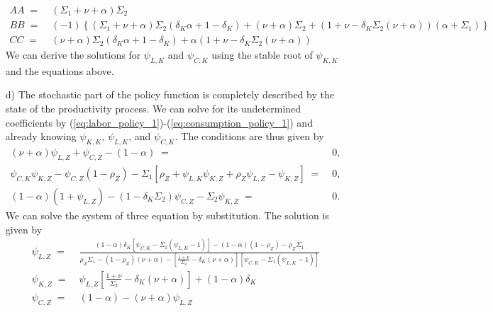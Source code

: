 \documentclass[a4paper, 12pt]{article}
\begin{document}
\begin{Answer}
\begin{small}
\begin{enumerate}
\begin{align*}
					AA \; = & \; \left(\Sigma_1+\nu+\alpha\right) \Sigma_2\\%
					BB \; = & \; \left(-1\right) \left\{ \left(\Sigma_1+\nu+\alpha\right)\Sigma_2\left(\delta_K\alpha+1-\delta_K\right)  + \left(\nu+\alpha\right)\Sigma_2 + \left(1+\nu-\delta_K \Sigma_2 \left(\nu+\alpha\right)\right) \left(\alpha+\Sigma_1\right)\right\}\\%
					CC \; = & \; \left(\nu+\alpha\right)\Sigma_2 \left(\delta_K \alpha+1-\delta_K\right) + \alpha \left(1+\nu-\delta_K \Sigma_2 \left(\nu+\alpha\right)\right)%
				  \end{align*}%
				  We can derive the solutions for $\psi_{L,K}$ and $\psi_{C,K}$ using the stable root of $\psi_{K,K}$ and the equations above.%
			\item[d) ] The stochastic part of the policy function is completely described by the state of the productivity process. We can solve for its undetermined coefficients by (\ref{eq:labor_policy_1})-(\ref{eq:consumption_policy_1}) and already knowing $\psi_{K,K}$, $\psi_{L,K}$, and $\psi_{C,K}$. The conditions are thus given by%
				  \begin{align}%
					\left(\nu+\alpha\right) \psi_{L,Z} + \psi_{C,Z} - \left(1-\alpha\right) \; = & \; 0,\\%
					\psi_{C,K}\psi_{K,Z} - \psi_{C,Z} \left(1-\rho_Z\right) - \Sigma_1 \left[ \rho_Z + \psi_{L,K} \psi_{K,Z} + \rho_Z \psi_{L,Z} - \psi_{K,Z} \right] \; = & \; 0,\\%
					\left(1-\alpha\right)\left(1+\psi_{L,Z}\right) - \left(1-\delta_K \Sigma_2\right) \psi_{C,Z} - \Sigma_2 \psi_{K,Z} \; = & \; 0.%
				  \end{align}%
				  We can solve the system of three equation by substitution. The solution is given by%
				  \begin{align}%
					\psi_{L,Z} \; = & \; \frac{\left(1-\alpha\right)\delta_K\left[\psi_{C,K}-\Sigma_1\left(\psi_{L,K}-1\right)\right]-\left(1-\alpha\right)\left(1-\rho_Z\right)-\rho_Z \Sigma_1}{\rho_Z \Sigma_1 - \left(1-\rho_Z\right)\left(\nu+\alpha\right)-\left[\frac{1+\nu}{\Sigma_2}-\delta_K\left(\nu+\alpha\right)\right] \left[\psi_{C,K}-\Sigma_1 \left(\psi_{L,K}-1\right)\right]}\\%
					\psi_{K,Z} \; = & \; \psi_{L,Z} \left[\frac{1+\nu}{\Sigma_2}-\delta_K \left(\nu+\alpha\right)\right] + \left(1-\alpha\right) \delta_K\\%
					\psi_{C,Z} \; = & \; \left(1-\alpha\right) - \left(\nu+\alpha\right) \psi_{L,Z}%
				  \end{align}%

\end{enumerate}
\end{small}
\end{Answer}
\end{document}
